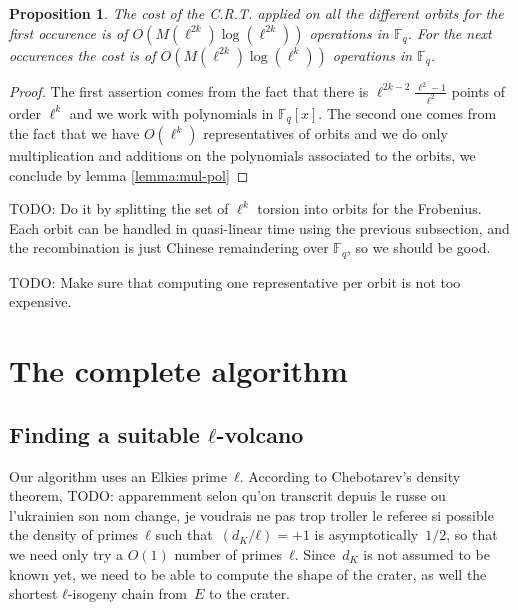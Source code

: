 \documentclass{lms}
\newcommand{\todo}[1]{{\color{red}TODO: #1}}
\newtheorem{prop}[thm]{Proposition}
\newcommand{\F}{\mathbb{F}}
\begin{document}
\begin{prop}
The cost of the C.R.T. applied on all the different orbits for the first occurence is of $O(M(\ell^{2k})\log(\ell^{2k}))$ operations in $\mathbb{F}_q$. For the next occurences the cost is of $O(M(\ell^{2k})\log(\ell^{k}))$ operations in $\mathbb{F}_q$.
\end{prop}

\begin{proof}
The first assertion comes from the fact that there is $\ell^{2k-2}\frac{\ell^2-1}{\ell^2}$ points of order $\ell^k$ and we work with polynomials in $\mathbb{F}_q[x]$. The second one comes from the fact that we have $O(\ell^k)$ representatives of orbits and we do only multiplication and additions on the polynomials associated to the orbits, we conclude by lemma \ref{lemma:mul-pol}
\end{proof}

\todo{Do it by splitting the set of $\ell^k$ torsion into orbits for
  the Frobenius. Each orbit can be handled in quasi-linear time using
  the previous subsection, and the recombination is just Chinese
  remaindering over $\F_q$, so we should be good.}

\todo{Make sure that computing one representative per orbit is not too
  expensive.}

\section{The complete algorithm}
\label{sec:complete-algorithm}
\subsection{Finding a suitable $ℓ$-volcano}
\label{sub:shape-volcano}

Our algorithm uses an Elkies prime~$ℓ$.
According to Chebotarev's density theorem,
\todo{apparemment selon qu'on transcrit depuis le russe ou l'ukrainien
son nom change, je voudrais ne pas trop troller le referee si possible}
the density of primes~$ℓ$ such that~$(d_K/ℓ) = +1$ is asymptotically~$1/2$,
so that we need only try a $O(1)$ number of primes~$ℓ$.
Since~$d_K$ is not assumed to be known yet,
we need to be able to compute the shape of the crater,
as well the shortest $ℓ$-isogeny chain from~$E$ to the crater.
\end{document}
